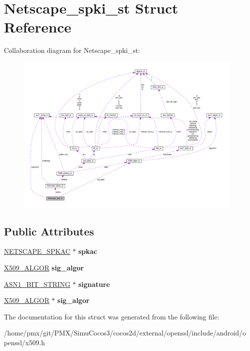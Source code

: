 \hypertarget{structNetscape__spki__st}{}\section{Netscape\+\_\+spki\+\_\+st Struct Reference}
\label{structNetscape__spki__st}


Collaboration diagram for Netscape\+\_\+spki\+\_\+st\+:
\nopagebreak
\begin{figure}[H]
\begin{center}
\leavevmode
\includegraphics[width=350pt]{structNetscape__spki__st__coll__graph}
\end{center}
\end{figure}
\subsection*{Public Attributes}
\begin{DoxyCompactItemize}
\item 
\mbox{\label{structNetscape__spki__st_a7ee02a7de36c36f4b9f28fe91a5ef3e8}} 
\hyperlink{structNetscape__spkac__st}{N\+E\+T\+S\+C\+A\+P\+E\+\_\+\+S\+P\+K\+AC} $\ast$ {\bfseries spkac}
\item 
\mbox{\label{structNetscape__spki__st_a140b2bdf1a5e647a0ed2828cd24ac17d}} 
\hyperlink{structX509__algor__st}{X509\+\_\+\+A\+L\+G\+OR} {\bfseries sig\+\_\+algor}
\item 
\mbox{\label{structNetscape__spki__st_a85fcada2d8adbc11d5a6a686600a4f6d}} 
\hyperlink{structasn1__string__st}{A\+S\+N1\+\_\+\+B\+I\+T\+\_\+\+S\+T\+R\+I\+NG} $\ast$ {\bfseries signature}
\item 
\mbox{\label{structNetscape__spki__st_a490105a4ef783d32f79fd00f72f8aa62}} 
\hyperlink{structX509__algor__st}{X509\+\_\+\+A\+L\+G\+OR} $\ast$ {\bfseries sig\+\_\+algor}
\end{DoxyCompactItemize}


The documentation for this struct was generated from the following file\+:\begin{DoxyCompactItemize}
\item 
/home/pmx/git/\+P\+M\+X/\+Simu\+Cocos3/cocos2d/external/openssl/include/android/openssl/x509.\+h\end{DoxyCompactItemize}
